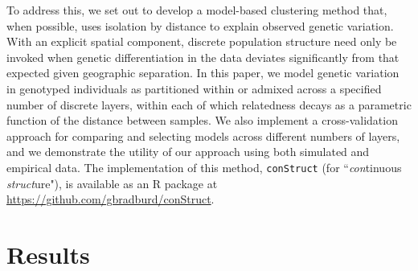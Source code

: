 \documentclass[10pt,letterpaper]{article}
\begin{document}
To address this, we set out to develop
a model-based clustering method that, when possible, uses isolation by distance 
to explain observed genetic variation.
With an explicit spatial component, discrete population structure need only be invoked when genetic differentiation 
in the data deviates significantly from that expected given geographic separation.
In this paper, 
we model genetic variation in genotyped individuals as 
partitioned within or admixed across a specified number of discrete layers,
within each of which relatedness decays as a parametric function of the distance between samples.
We also implement a cross-validation approach for comparing and selecting models across different numbers of layers,
and we demonstrate the utility of our approach using both simulated and empirical data.
The implementation of this method, \texttt{conStruct} (for ``\emph{con}tinuous \emph{struct}ure"), 
is available as an R package at 
\href{https://github.com/gbradburd/conStruct}{https://github.com/gbradburd/conStruct}.

\section*{Results}
\end{document}
